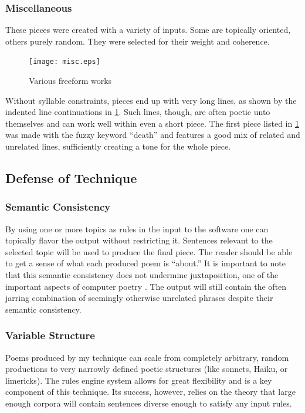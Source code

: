 \documentclass[10pt]{article}
\begin{document}
\subsubsection{Miscellaneous}

These pieces were created with a variety of inputs. Some are topically
oriented, others purely random. They were selected for their weight and
coherence.

\begin{figure}[here]
\begin{center}
    \texttt{[image: misc.eps]}
\end{center}
\caption{Various freeform works}
\label{fig:misc}
\end{figure}

Without syllable constraints, pieces end up with very long lines, as shown by
the indented line continuations in \ref{fig:misc}. Such lines, though, are
often poetic unto themselves and can work well within even a short piece. The
first piece listed in \ref{fig:misc} was made with the fuzzy keyword ``death''
and features a good mix of related and unrelated lines, sufficiently creating a
tone for the whole piece.

\subsection{Defense of Technique}

\subsubsection{Semantic Consistency}
By using one or more topics as rules in the input to the software one can
topically flavor the output without restricting it. Sentences relevant to the
selected topic will be used to produce the final piece. The reader should be
able to get a sense of what each produced poem is ``about.'' It is important to
note that this semantic consistency does not undermine juxtaposition, one of
the important aspects of computer poetry \cite{Hart96}. The output will still
contain the often jarring combination of seemingly otherwise unrelated phrases
despite their semantic consistency.

\subsubsection{Variable Structure}
Poems produced by my technique can scale from completely arbitrary, random
productions to very narrowly defined poetic structures (like sonnets, Haiku, or
limericks). The rules engine system allows for great flexibility and is a key
component of this technique. Its success, however, relies on the theory that
large enough corpora will contain sentences diverse enough to satisfy any input
rules.
\end{document}
